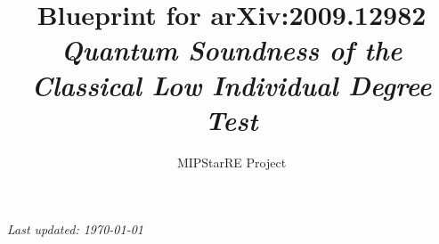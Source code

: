 \documentclass[a4paper]{report}
\title{Blueprint for arXiv:2009.12982\\
\large\textit{Quantum Soundness of the Classical Low Individual Degree Test}}
\author{MIPStarRE Project}
\begin{document}
\maketitle
\noindent\textit{Last updated: \today}\par
\vspace{1ex}
\tableofcontents



\end{document}
